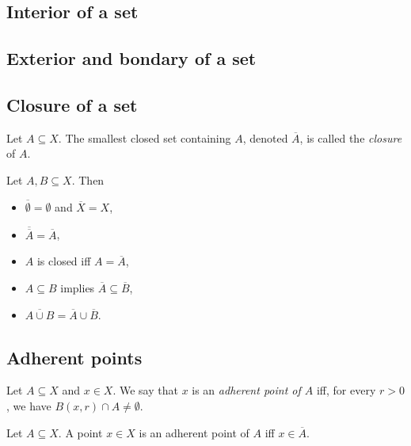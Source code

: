\documentclass{article}
\begin{document}
\subsection{Interior of a set}

\subsection{Exterior and bondary of a set}

\subsection{Closure of a set}

\begin{definition}
    Let $A\subseteq X$. The smallest closed set containing $A$, denoted $\overline A$, is called
    the \emph{closure} of $A$.
\end{definition}

\begin{proposition}[Notes 4.26]
    Let $A,B\subseteq X$. Then
    \begin{itemize}
        \item $\overline\emptyset = \emptyset$ and $\overline X = X$,
        \item $\overline{\overline A} = \overline A$,
        \item $A$ is closed iff $A=\overline A$,
        \item $A\subseteq B$ implies $\overline A\subseteq\overline B$,
        \item $\overline{A\cup B} = \overline A \cup \overline B$.
    \end{itemize} 
\end{proposition}

\subsection{Adherent points}

\begin{definition}[Notes 4.27]
    Let $A\subseteq X$ and $x\in X$. We say that $x$ is an \emph{adherent point of $A$}
    iff, for every $r>0$, we have $B(x,r)\cap A\not=\emptyset$. 
\end{definition}

\begin{proposition}[Notes 4.29]
    Let $A\subseteq X$. A point $x\in X$ is an adherent point of $A$ iff 
    $x\in\overline A$. 
\end{proposition}
\end{document}

